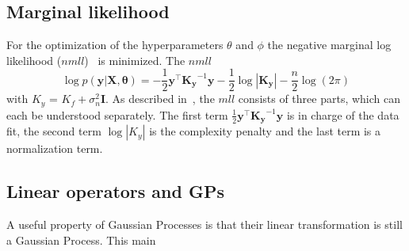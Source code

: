\documentclass{article}
\begin{document}
\subsection{Marginal likelihood}

For the optimization of the hyperparameters $\theta$ and $\phi$ the negative
marginal log likelihood ($nmll$)~\cite{RasmussenCarlEdward} is minimized. The
$nmll$
\begin{equation}
    \label{eq:nmll}
    \log p(\bm{y}|\bm{X},\bm{\theta}) = -\frac{1}{2}\bm{y}^\intercal \bm{K_y}^{-1}\bm{y} - \frac{1}{2}\log\left\lvert \bm{K_y}\right\rvert - \frac{n}{2}\log(2\pi)
\end{equation}
with $K_y$ = $K_f + \sigma_n^2 \bm{I}$. As described in~\cite{RasmussenCarlEdward}, the $mll$ consists of three parts, which can each be understood separately. The first term $\frac{1}{2}\bm{y}^\intercal \bm{K_y}^{-1}\bm{y}$ is in charge of the data fit, the second term $\log\left\lvert K_y\right\rvert$ is the complexity penalty and the last term is a normalization term.

\subsection{Linear operators and GPs}
A useful property of Gaussian Processes is that their linear transformation is
still a Gaussian Process. This main
\end{document}
